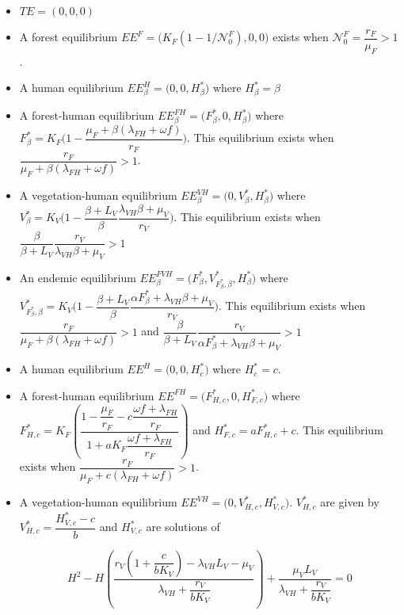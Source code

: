 \documentclass{article}
\newcommand{\lf}{\lambda_{FH}}
\newcommand{\lv}{\lambda_{VH}}
\newcommand{\NF}{\mathcal{N}_0^F}
\newcommand{\Fbeta}{F^*_\beta}
\newcommand{\VbetaF}{V^*_{\Fbeta, \beta}}
\begin{document}
\begin{itemize}
\item $TE = (0,0,0)$
\item A forest equilibrium $EE^F = \Big( K_F(1-1/\NF), 0, 0 \Big) $ exists when $\NF = \dfrac{r_F}{\mu_F} > 1$.

\item A human equilibrium $EE^H_\beta = \Big(0,0,H^*_\beta \Big)$ where $ H^*_\beta = \beta$
\item A forest-human equilibrium $EE^{FH}_\beta = \Big(F^*_\beta, 0, H^*_\beta\Big)$ where $F^*_\beta = K_F \Big(1-\dfrac{\mu_F + \beta(\lf + \omega f)}{r_F} \Big)$.
This equilibrium exists when $\dfrac{r_F}{\mu_F + \beta(\lf + \omega f)} > 1$.
\item A vegetation-human equilibrium $EE^{VH}_\beta = \Big(0, V^*_{\beta}, H^*_\beta \Big)$ where $V^*_\beta = K_V \Big(1- \dfrac{\beta + L_V}{\beta} \dfrac{\lv \beta + \mu_V}{r_V} \Big)$. This equilibrium exists when $\dfrac{\beta}{\beta + L_V} \dfrac{r_V}{\lv \beta + \mu_V} > 1$
\item An endemic equilibrium $EE_\beta^{FVH} = \Big(F^*_\beta, V^*_{F^*_\beta, \beta}, H^*_\beta \Big)$ where $\VbetaF = K_V \Big(1- \dfrac{\beta +L_V}{\beta} \dfrac{\alpha \Fbeta + \lv \beta + \mu_V}{r_V} \Big)$. This equilibrium exists  when $\dfrac{r_F}{\mu_F + \beta(\lf + \omega f)} > 1$ and $\dfrac{\beta}{\beta + L_V} \dfrac{r_V}{\alpha \Fbeta + \lv \beta + \mu_V} > 1$


\item A human equilibrium $EE^H = \Big(0,0,H^*_c)$ where $H^*_c = c$.
\item A forest-human equilibrium $EE^{FH} = \Big(F^*_{H, c}, 0, H^*_{F, c} \Big)$ where $F^*_{H,c} = K_F \left( \dfrac{1 - \dfrac{\mu_F}{r_F} - c \dfrac{\omega f + \lf}{r_F}}{1 + a K_F \dfrac{\omega f + \lf}{r_F}} \right)$ and $H^*_{F,c} = a F^*_{H, c} + c$. This equilibrium exists when $\dfrac{r_F}{\mu_F + c(\lf + \omega f)} > 1$.

\item A vegetation-human equilibrium $EE^{VH} = \Big(0, V^*_{H, c}, H^*_{V, c} \Big)$. $V^*_{H, c}$ are given by $V^*_{H, c} = \dfrac{H^*_{V, c} - c}{b}$ and $H^*_{V, c}$ are solutions of

\begin{equation}
H^2 - H \left( \dfrac{r_V(1 + \dfrac{c}{bK_V}) - \lv L_V - \mu_V}{\lv + \dfrac{r_V}{bK_V}} \right) + \dfrac{\mu_V L_V}{\lv + \dfrac{r_V}{bK_V}} = 0
\label{eqVH:equation H}
\end{equation}


\end{itemize}
\end{document}
